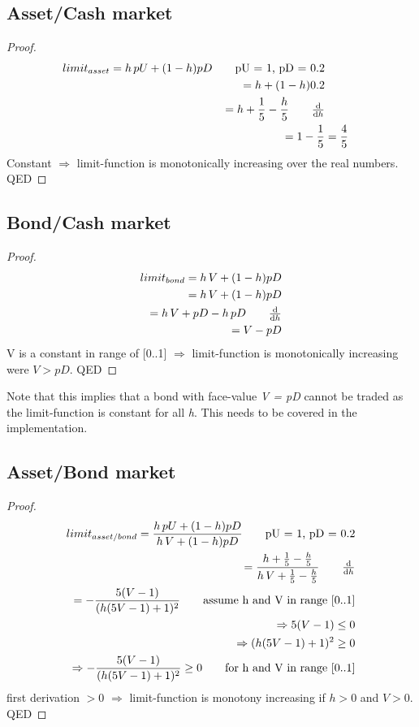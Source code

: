 \documentclass[Bachelorarbeit.tex]{subfiles}
\begin{document}
\subsection{Asset/Cash market}
\begin{proof}
\begin{align*}
	limit_{asset} = h \, pU + (1-h) pD		\tag*{pU = 1, pD = 0.2}
	\\ = h + (1 - h)0.2
	\\ = h + \frac{1}{5} - \frac{h}{5}		\tag*{$\frac{\mathrm d}{\mathrm d h}$}
	\\ = 1 - \frac{1}{5}
		&= \frac{4}{5}
\end{align*}
Constant $\Rightarrow$ limit-function is monotonically increasing over the real numbers. QED
\end{proof}

\subsection{Bond/Cash market}
\begin{proof}
\begin{align*}
	limit_{bond} = h \, V + (1-h) pD			
	\\ = h \, V + (1 - h)pD
	\\ = h \, V + pD - h\,pD		\tag*{$\frac{\mathrm d}{\mathrm d h}$}
	\\ = V - pD
\end{align*}
V is a constant in range of [0..1] $\Rightarrow$ limit-function is monotonically increasing were $V > pD$. QED
\end{proof}

Note that this implies that a bond with face-value \textit{V = pD} cannot be traded as the limit-function is constant for all \textit{h}. This needs to be covered in the implementation.

\subsection{Asset/Bond market}
\begin{proof}
\begin{align*}
	limit_{asset/bond} = \frac{h \, pU + (1-h) pD}{h \, V + (1-h) pD} 				\tag*{pU = 1, pD = 0.2}
	\\ = \frac{h + \frac{1}{5} - \frac{h}{5}}{h \, V + \frac{1}{5} - \frac{h}{5}}	\tag*{$\frac{\mathrm d}{\mathrm d h}$}
	\\ = - \frac{5(V-1)}{(h(5V-1)+1)^2}									\tag*{assume h and V in range [0..1]}
	\\ \Rightarrow 5(V-1) \leq 0
	\\ \Rightarrow (h(5V-1)+1)^2 \geq 0
	\\ \Rightarrow - \frac{5(V-1)}{(h(5V-1)+1)^2} \geq 0 			\tag*{for h and V in range [0..1]}
\end{align*}
first derivation $> 0$ $\Rightarrow$ limit-function is monotony increasing if $h > 0$ and $V > 0$. QED
\end{proof}
\end{document}
